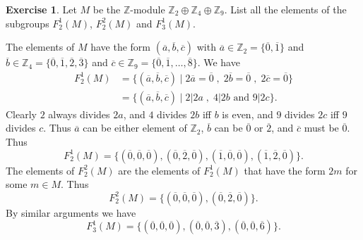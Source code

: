 \documentclass{amsart}
\newcommand{\Z}         {{\mathbb{Z}}}
\newcommand{\ov}[1]     {\overline{#1}}
\newcommand{\st}        {\;|\;}
\newcommand{\ip}[1]     {\langle #1\rangle}
\newcommand{\op}        {\oplus}
\renewcommand{\:}{\colon}
\theoremstyle{definition}
\newtheorem{exercise}{Exercise}[section]
\renewenvironment{solution}{\SolutionAtEnd}{\endSolutionAtEnd}
\begin{document}
\begin{exercise}
 Let $M$ be the $\Z$-module $\Z_2\op\Z_4\op\Z_9$.  List all the
 elements of the subgroups $F_2^1(M)$, $F_2^2(M)$ and $F_3^1(M)$.
\end{exercise}
\begin{solution}
 The elements of $M$ have the form $(\ov{a},\ov{b},\ov{c})$ with
 $\ov{a}\in\Z_2=\{\ov{0},\ov{1}\}$ and
 $\ov{b}\in\Z_4=\{\ov{0},\ov{1},\ov{2},\ov{3}\}$ and
 $\ov{c}\in\Z_9=\{\ov{0},\ov{1},\ldots,\ov{8}\}$.  We have
 \begin{align*}
   F_2^1(M) &=
    \{(\ov{a},\ov{b},\ov{c}) \st
      2\ov{a}=\ov{0}\;,\;2\ov{b}=\ov{0}\;,\;2\ov{c}=\ov{0} \} \\
   &= \{(\ov{a},\ov{b},\ov{c}) \st 2 | 2a\;,\; 4|2b \text{ and } 9|2c\}.
 \end{align*}
 Clearly $2$ always divides $2a$, and $4$ divides $2b$ iff $b$ is
 even, and $9$ divides $2c$ iff $9$ divides $c$.  Thus $\ov{a}$ can be
 either element of $\Z_2$, $\ov{b}$ can be $\ov{0}$ or $\ov{2}$, and
 $\ov{c}$ must be $\ov{0}$.  Thus
 \[ F_2^1(M) = \{ (\ov{0},\ov{0},\ov{0}),
                  (\ov{0},\ov{2},\ov{0}),
                  (\ov{1},\ov{0},\ov{0}),
                  (\ov{1},\ov{2},\ov{0}) \}.
 \]
 The elements of $F_2^2(M)$ are the elements of $F_2^1(M)$ that have
 the form $2m$ for some $m\in M$.  Thus 
 \[ F_2^2(M) = \{ (\ov{0},\ov{0},\ov{0}), (\ov{0},\ov{2},\ov{0}) \}. \]
 By similar arguments we have  
 \[ F_3^1(M) = \{ (\ov{0},\ov{0},\ov{0}), 
                  (\ov{0},\ov{0},\ov{3}),
                  (\ov{0},\ov{0},\ov{6}) \}.
 \]
\end{solution}
\end{document}
